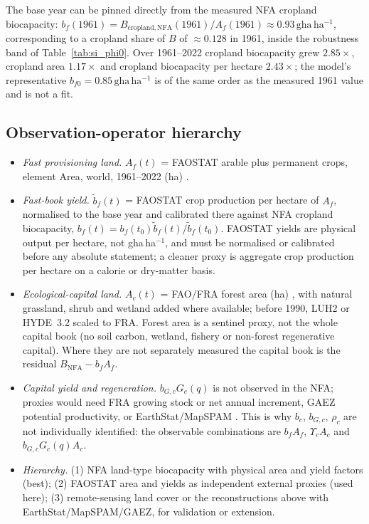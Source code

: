 \documentclass[11pt,a4paper]{article}
\newcommand{\Ups}{\Upsilon_c}
\begin{document}
The base year can be pinned directly from the measured NFA cropland biocapacity: $b_f(1961)=B_{\mathrm{cropland,NFA}}(1961)/A_f(1961)\approx0.93\,\mathrm{gha\,ha^{-1}}$, corresponding to a cropland share of $B$ of $\approx0.128$ in 1961, inside the robustness band of Table~\ref{tab:si_phi0}. Over 1961--2022 cropland biocapacity grew $2.85\times$, cropland area $1.17\times$ and cropland biocapacity per hectare $2.43\times$; the model's representative $b_{f0}=0.85\,\mathrm{gha\,ha^{-1}}$ is of the same order as the measured 1961 value and is not a fit.

\subsection{Observation-operator hierarchy}\label{si:operator}

\begin{itemize}[leftmargin=1.5em]
\item \emph{Fast provisioning land.} $A_f(t)$ = FAOSTAT arable plus permanent crops, element Area, world, 1961--2022 (ha) \citep{FAO2023}.
\item \emph{Fast-book yield.} $\tilde b_f(t)$ = FAOSTAT crop production per hectare of $A_f$, normalised to the base year and calibrated there against NFA cropland biocapacity, $b_f(t)=b_f(t_0)\tilde b_f(t)/\tilde b_f(t_0)$. FAOSTAT yields are physical output per hectare, not gha\,ha$^{-1}$, and must be normalised or calibrated before any absolute statement; a cleaner proxy is aggregate crop production per hectare on a calorie or dry-matter basis.
\item \emph{Ecological-capital land.} $A_c(t)$ = FAO/FRA forest area (ha) \citep{FAO2020}, with natural grassland, shrub and wetland added where available; before 1990, LUH2 \citep{Hurtt2011} or HYDE~3.2 \citep{KleinGoldewijk2017} scaled to FRA. Forest area is a sentinel proxy, not the whole capital book (no soil carbon, wetland, fishery or non-forest regenerative capital). Where they are not separately measured the capital book is the residual $B_{\mathrm{NFA}}-b_fA_f$.
\item \emph{Capital yield and regeneration.} $b_{G,c}G_c(q)$ is not observed in the NFA; proxies would need FRA growing stock or net annual increment, GAEZ potential productivity, or EarthStat/MapSPAM \citep{Monfreda2008}. This is why $b_c$, $b_{G,c}$, $\rho_c$ are not individually identified: the observable combinations are $b_fA_f$, $\Ups A_c$ and $b_{G,c}G_c(q)A_c$.
\item \emph{Hierarchy.} (1) NFA land-type biocapacity with physical area and yield factors (best); (2) FAOSTAT area and yields as independent external proxies (used here); (3) remote-sensing land cover \citep{ESA2017,Copernicus2019} or the reconstructions above with EarthStat/MapSPAM/GAEZ, for validation or extension.
\end{itemize}
\end{document}
